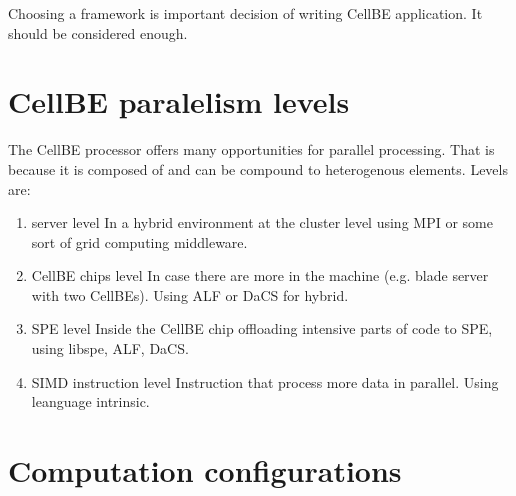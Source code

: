Choosing a framework is important decision of writing CellBE application. It should be considered enough.

\section {CellBE paralelism levels}

The CellBE processor offers many opportunities for parallel processing. That is because it is composed of and can be compound to heterogenous elements. Levels are:
\begin{enumerate}
\item server level 
In a hybrid environment at the cluster level using MPI or some sort of grid computing middleware.

\item CellBE chips level
In case there are more in the machine (e.g. blade server with two CellBEs). Using ALF or DaCS for hybrid.

\item SPE level 
Inside the CellBE chip offloading intensive parts of code to SPE, using libspe, ALF, DaCS.

\item SIMD instruction level
Instruction that process more data in parallel. Using leanguage intrinsic.
\end{enumerate}

\section{Computation configurations}

